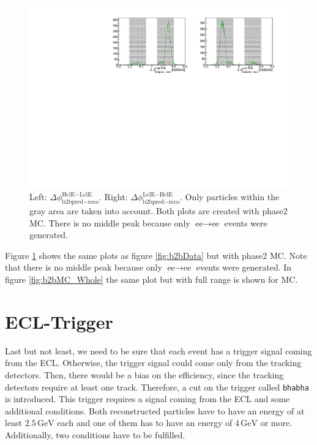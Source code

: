 \documentclass[a4paper,11pt,twosided,final,german,openbib,pdftex,listof=totoc,bibliography=totoc]{scrbook}
\begin{document}
\begin{figure}[h!]
	\centering
	\includegraphics[width=\textwidth]{Plots/master/sb2b_MC.pdf}
	\caption[b2bClusterPhi - clusterPhi For MC]{Left: $\Delta \phi _{\textrm{b2bpred} - \textrm{reco}}^{\textrm{HclE}-\textrm{LclE}}$. Right:  $\Delta \phi _{\textrm{b2bpred} - \textrm{reco}}^{\textrm{LclE}-\textrm{HclE}}$. Only particles within the gray area are taken into account. Both plots are created with phase2 MC. There is no middle peak because only $\textrm{ee} \rightarrow \textrm{ee}$ events were generated.}
	\label{fig:b2bMC}
\end{figure}



Figure \ref{fig:b2bMC} shows the same plots as figure \ref{fig:b2bData} but with phase2 MC. Note that there is no middle peak because only $\textrm{ee} \rightarrow \textrm{ee}$ events were generated. In figure \ref{fig:b2bMC_Whole} the same plot but with full range is shown for MC.

\section{ECL-Trigger}
\label{sec:ECLTrigger}

Last but not least, we need to be sure that each event has a trigger signal coming from the ECL. Otherwise, the trigger signal could come only from the tracking detectors. Then, there would be a bias on the efficiency, since the tracking detectors require at least one track. Therefore, a cut on the trigger called \texttt{bhabha} is introduced. This trigger requires a signal coming from the ECL and some additional conditions. Both reconstructed particles have to have an energy of at least $2.5\,\textrm{GeV}$ each and one of them has to have an energy of $4\,\textrm{GeV}$ or more. Additionally, two conditions have to be fulfilled. 
\end{document}
